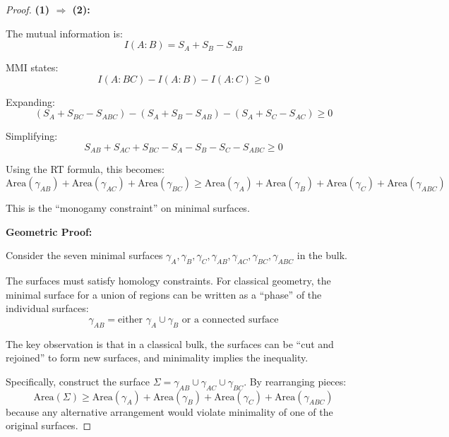 \documentclass[12pt,a4paper]{article}
\begin{document}
\begin{proof}
\textbf{(1) $\Rightarrow$ (2):}

The mutual information is:
\begin{equation}
I(A:B) = S_A + S_B - S_{AB}
\end{equation}

MMI states:
\begin{equation}
I(A:BC) - I(A:B) - I(A:C) \geq 0
\end{equation}

Expanding:
\begin{equation}
(S_A + S_{BC} - S_{ABC}) - (S_A + S_B - S_{AB}) - (S_A + S_C - S_{AC}) \geq 0
\end{equation}

Simplifying:
\begin{equation}
S_{AB} + S_{AC} + S_{BC} - S_A - S_B - S_C - S_{ABC} \geq 0
\end{equation}

Using the RT formula, this becomes:
\begin{equation}
\text{Area}(\gamma_{AB}) + \text{Area}(\gamma_{AC}) + \text{Area}(\gamma_{BC}) \geq \text{Area}(\gamma_A) + \text{Area}(\gamma_B) + \text{Area}(\gamma_C) + \text{Area}(\gamma_{ABC})
\end{equation}

This is the ``monogamy constraint'' on minimal surfaces. 

\textbf{Geometric Proof:}

Consider the seven minimal surfaces $\gamma_A, \gamma_B, \gamma_C, \gamma_{AB}, \gamma_{AC}, \gamma_{BC}, \gamma_{ABC}$ in the bulk.

The surfaces must satisfy homology constraints. For classical geometry, the minimal surface for a union of regions can be written as a ``phase'' of the individual surfaces:
\begin{equation}
\gamma_{AB} = \text{either } \gamma_A \cup \gamma_B \text{ or a connected surface}
\end{equation}

The key observation is that in a classical bulk, the surfaces can be ``cut and rejoined'' to form new surfaces, and minimality implies the inequality.

Specifically, construct the surface $\Sigma = \gamma_{AB} \cup \gamma_{AC} \cup \gamma_{BC}$. By rearranging pieces:
\begin{equation}
\text{Area}(\Sigma) \geq \text{Area}(\gamma_A) + \text{Area}(\gamma_B) + \text{Area}(\gamma_C) + \text{Area}(\gamma_{ABC})
\end{equation}
because any alternative arrangement would violate minimality of one of the original surfaces.


\end{proof}
\end{document}
